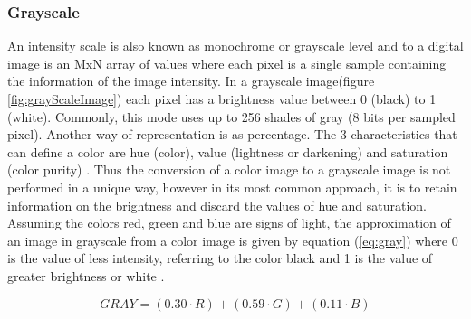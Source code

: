 \subsubsection{Grayscale}
An intensity scale is also known as monochrome or grayscale level and to a digital image is an MxN array of values where each pixel is a single sample containing the information of the image intensity\cite{dip4}. In a grayscale image(figure \ref{fig:grayScaleImage}) each pixel has a brightness value between 0 (black) to 1 (white). Commonly, this mode uses up to 256 shades of gray (8 bits per sampled pixel). Another way of representation is as percentage. The 3 characteristics that can define a color are hue (color), value (lightness or darkening) and saturation (color purity) \cite{dip4}. Thus the conversion of a color image to a grayscale image is not performed in a unique way, however in its most common approach\cite{dip3}, it is to retain information on the brightness and discard the values of hue and saturation. Assuming the colors red, green and blue are signs of light, the approximation of an image in grayscale from a color image is given by equation (\ref{eq:gray}) where 0 is the value of less intensity, referring to the color black and 1 is the value of greater brightness or white \cite{dip4}.

\begin{equation}
	GRAY = (0.30 \cdot R) + (0.59 \cdot G) + (0.11 \cdot B)
	\label{eq:gray}
\end{equation}

